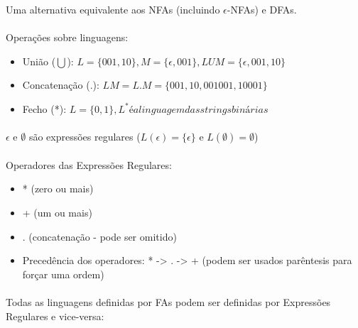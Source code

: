 \documentclass[../resumosTCOM.tex]{subfiles}
\begin{document}
 

Uma alternativa equivalente aos NFAs (incluindo $\epsilon$-NFAs) e DFAs.

\paragraph{}

Operações sobre linguagens:
\begin{itemize}
    \item União ($\bigcup$): \(L=\{001, 10\}, M=\{\epsilon, 001\}, LUM=\{\epsilon, 001, 10\}\)
    \item Concatenação (.): \(LM=L.M=\{001, 10, 001001, 10001\}\)
    \item Fecho (*): \(L=\{0, 1\}, L^* é a linguagem das strings binárias\)
\end{itemize}

\paragraph{}

$\epsilon$ e $\emptyset$ são expressões regulares (\(L(\epsilon) = \{\epsilon\}\) e \(L(\emptyset) = \emptyset\))

\paragraph{}

Operadores das Expressões Regulares:
\begin{itemize}
    \item * (zero ou mais)
    \item + (um ou mais)
    \item . (concatenação - pode ser omitido)
    \item Precedência dos operadores: * -> . -> + (podem ser usados parêntesis para forçar uma ordem)
\end{itemize}

\paragraph{}

Todas as linguagens definidas por FAs podem ser definidas por Expressões Regulares e vice-versa:
\begin{figure}[H]
    \centering
    \label{fig:fa_re}%
\end{figure}
\end{document}
